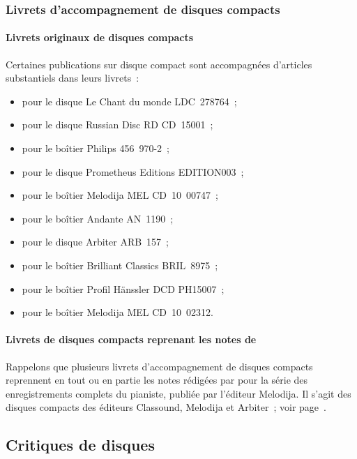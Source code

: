 \subsubsection{Livrets d'accompagnement de disques compacts}

\paragraph{Livrets originaux de disques compacts}

Certaines publications sur disque compact sont accompagnées d'articles
substantiels dans leurs livrets~:
\begin{itemize}
 \item
 \citet{Lischke85} pour le disque Le Chant du monde LDC~278764~;
 \item
 \citet{Ledin93} pour le disque Russian Disc RD CD~15001~;
 \item
 \citet{Malik99} pour le boîtier Philips 456~\hbox{970-2}~;
 \item
 \citet{Lobanov02} pour le disque Prometheus Editions EDITION003~;
 \item
 \citet{Rueger05} pour le boîtier Melodija MEL CD~10~00747~;
 \item
 \citet{Distler05} pour le boîtier Andante AN~1190~;
 \item
 \citet{Evans08} pour le disque Arbiter ARB~157~;
 \item
 \citet{Sofronitsky08} pour le boîtier Brilliant Classics BRIL~8975~;
 \item
 \citet{Stove15} pour le boîtier Profil Hänssler DCD PH15007~;
 \item
 \citet{Mukosey15} pour le boîtier Melodija MEL CD~10~02312.
\end{itemize}

\paragraph{Livrets de disques compacts reprenant les notes de
\citeauthor{Nikonovich79}}

Rappelons que plusieurs livrets d'accompagnement de disques compacts
reprennent en tout ou en partie les notes rédigées par \citet{Nikonovich79}
pour la série des enregistrements complets du pianiste, publiée par
l'éditeur Melodija.
Il s'agit des disques compacts des éditeurs Classound, Melodija et Arbiter~;
voir page~\pageref{sssec:NotesNikonovich}.

\subsection{Critiques de disques}

